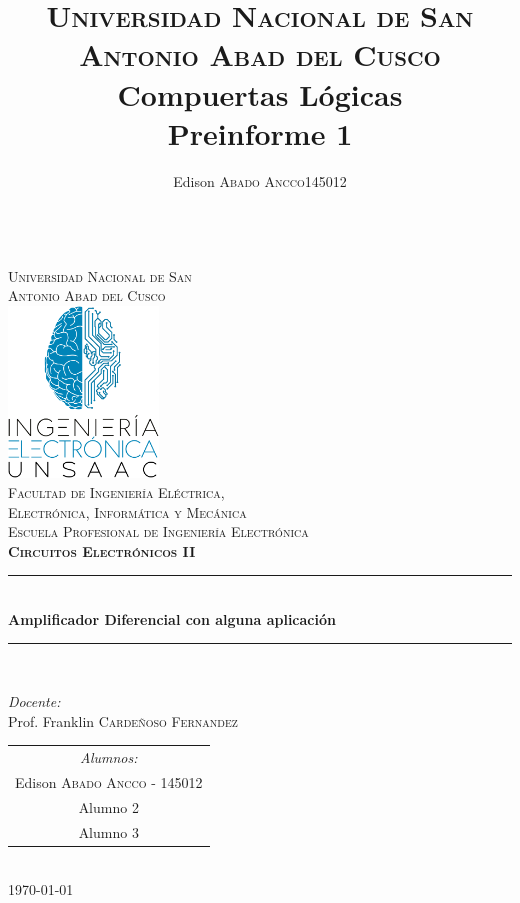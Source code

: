 \documentclass[a4paper]{article} %
\title{
	\textsc{Universidad Nacional de San Antonio Abad del Cusco}\\
	\textbf{Compuertas Lógicas}\\
	Preinforme 1}
\author{
	\begin{tabular}{lr}
		Edison \textsc{Abado Ancco} & 145012 \\
	\end{tabular}
}
\begin{document}
	\begin{titlepage}
		\newcommand{\HRule}{\rule{\linewidth}{0.5mm}} 
		\center
		\textsc{\LARGE \vspace{1.1cm} \\ Universidad Nacional de San \\[0.2cm] Antonio Abad del Cusco}\\[1.2cm] 
		\includegraphics[width=4cm]{IMAGENES/logoLiC}\\[1cm]
		\textsc{\Large Facultad de Ingeniería Eléctrica, \\ Electrónica, Informática y Mecánica}\\[0.5cm] 
		\textsc{\large Escuela Profesional de Ingeniería Electrónica}\\[0.5cm]
		\textsc{\Large \textbf{Circuitos Electrónicos II}}\\[0.5cm] 
		\HRule \\[0.4cm]
		{ \huge \bfseries Amplificador Diferencial con alguna aplicación}\\[0.30cm] 
		\HRule \\[1.4cm]
		\begin{minipage}{\textwidth}
			\center 
			
			\emph{Docente:} \\
			Prof. Franklin  \textsc{Cardeñoso Fernandez} \\[1cm]
			
			\begin{tabular}{c}
				\emph{Alumnos:}  \\
				Edison   \textsc{Abado Ancco} - 145012 \\
				Alumno 2 \\
				Alumno 3
			\end{tabular}
		\end{minipage}\\[2cm]
		\today
	\end{titlepage}
	
	
\newpage
	
	
\end{document}
